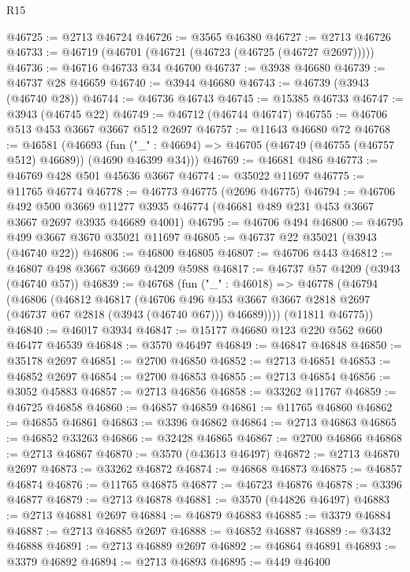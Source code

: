 \begin{lexlean}{R15}
\begin{coremodule}
@46725 := @2713 @46724
@46726 := @3565 @46380
@46727 := @2713 @46726
@46733 := @46719 (@46701 (@46721 (@46723 (@46725 (@46727 @2697)))))
@46736 := @46716 @46733 @34 @46700
@46737 := @3938 @46680
@46739 := @46737 @28 @46659
@46740 := @3944 @46680
@46743 := @46739 (@3943 (@46740 @28))
@46744 := @46736 @46743
@46745 := @15385 @46733
@46747 := @3943 (@46745 @22)
@46749 := @46712 (@46744 @46747)
@46755 := @46706 @513 @453 @3667 @3667 @512 @2697
@46757 := @11643 @46680 @72
@46768 := @46581
    (@46693
      (fun ("_" : @46694) => @46705 (@46749 (@46755 (@46757 @512) @46689)) (@4690 @46399 @34)))
@46769 := @46681 @486
@46773 := @46769 @428 @501 @45636 @3667
@46774 := @35022 @11697
@46775 := @11765 @46774
@46778 := @46773 @46775 (@2696 @46775)
@46794 := @46706
    @492
    @500
    @3669
    @11277
    @3935
    @46774
    (@46681 @489 @231 @453 @3667 @3667 @2697 @3935 @46689 @4001)
@46795 := @46706 @494
@46800 := @46795 @499 @3667 @3670 @35021 @11697
@46805 := @46737 @22 @35021 (@3943 (@46740 @22))
@46806 := @46800 @46805
@46807 := @46706 @443
@46812 := @46807 @498 @3667 @3669 @4209 @5988
@46817 := @46737 @57 @4209 (@3943 (@46740 @57))
@46839 := @46768
    (fun ("_" : @46018) =>
    @46778
      (@46794
        (@46806
          (@46812
            @46817
            (@46706
              @496
              @453
              @3667
              @3667
              @2818
              @2697
              (@46737 @67 @2818 (@3943 (@46740 @67)))
              @46689))))
      (@11811 @46775))
@46840 := @46017 @3934
@46847 := @15177 @46680 @123 @220 @562 @660 @46477 @46539
@46848 := @3570 @46497
@46849 := @46847 @46848
@46850 := @35178 @2697
@46851 := @2700 @46850
@46852 := @2713 @46851
@46853 := @46852 @2697
@46854 := @2700 @46853
@46855 := @2713 @46854
@46856 := @3052 @45883
@46857 := @2713 @46856
@46858 := @33262 @11767
@46859 := @46725 @46858
@46860 := @46857 @46859
@46861 := @11765 @46860
@46862 := @46855 @46861
@46863 := @3396 @46862
@46864 := @2713 @46863
@46865 := @46852 @33263
@46866 := @32428 @46865
@46867 := @2700 @46866
@46868 := @2713 @46867
@46870 := @3570 (@43613 @46497)
@46872 := @2713 @46870 @2697
@46873 := @33262 @46872
@46874 := @46868 @46873
@46875 := @46857 @46874
@46876 := @11765 @46875
@46877 := @46723 @46876
@46878 := @3396 @46877
@46879 := @2713 @46878
@46881 := @3570 (@44826 @46497)
@46883 := @2713 @46881 @2697
@46884 := @46879 @46883
@46885 := @3379 @46884
@46887 := @2713 @46885 @2697
@46888 := @46852 @46887
@46889 := @3432 @46888
@46891 := @2713 @46889 @2697
@46892 := @46864 @46891
@46893 := @3379 @46892
@46894 := @2713 @46893
@46895 := @449 @46400

\end{coremodule}
\end{lexlean}
